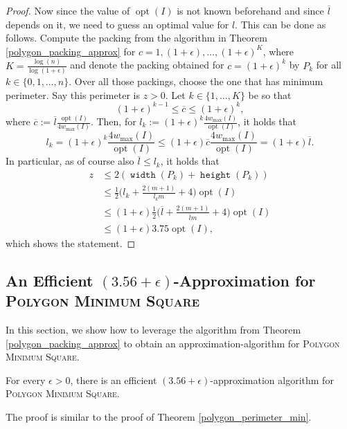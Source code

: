 \documentclass[a4paper,UKenglish,cleveref, autoref, thm-restate]{lipics_v2021}
\DeclareMathOperator{\opt}{opt}
\DeclareMathOperator{\width}{\mathtt{width}}
\DeclareMathOperator{\height}{\mathtt{height}}
\begin{document}
\begin{proof}
Now since the value of $\opt(I)$ is not known beforehand and since $\overline{l}$ depends on it, we need to guess an optimal value for $l$. This can be done as follows. Compute the packing from the algorithm in Theorem \ref{polygon_packing_approx} for $c=1,(1+\epsilon), \dots, (1+\epsilon)^K$, where $K=\frac{\log(n)}{\log(1+\epsilon)}$ and denote the packing obtained for $c=(1+\epsilon)^k$ by $P_k$ for all $k \in \{0,1, \dots, n\}$. Over all those packings, choose the one that has minimum perimeter. Say this perimeter is $z > 0$. Let $k \in \{1, \dots, K\}$ be so that
\[
(1+\epsilon)^{k-1} \leq \overline{c} \leq (1+\epsilon)^{k},
\]
where $\overline{c} := \overline{l} \frac{\opt(I)}{4w_{\max}(I)}$. Then, for $l_k := (1+\epsilon)^k \frac{4w_{\max}(I)}{\opt(I)}$, it holds that
\[
l_k = (1+\epsilon)^k \frac{4w_{\max}(I)}{\opt(I)} \leq (1+\epsilon) \overline{c}\frac{4w_{\max}(I)}{\opt(I)} = (1+\epsilon)\overline{l}.
\]
In particular, as of course also $\overline{l} \leq l_k$, it holds that
\begin{align*}
z & \leq 2(\width(P_k) + \height(P_k)) \\
&\leq \frac{1}{2} \bigg( l_k+\frac{2(m+1)}{l_km} + 4 \bigg) \opt(I) \\
&\leq (1+\epsilon) \frac{1}{2} \bigg( \overline{l}+\frac{2(m+1)}{\overline{l}m} + 4 \bigg) \opt(I) \\
&\leq (1+\epsilon)3.75 \opt(I),
\end{align*}
which shows the statement.
\end{proof}


\subsection{An Efficient $(3.56+\epsilon)$-Approximation for \textsc{Polygon Minimum Square}}
\label{section_polygon_min_square}

In this section, we show how to leverage the algorithm from Theorem \ref{polygon_packing_approx} to obtain an approximation-algorithm for \textsc{Polygon Minimum Square}.

\begin{theorem}
For every $\epsilon>0$, there is an efficient $(3.56+\epsilon)$-approximation algorithm for \textsc{Polygon Minimum Square}.
\end{theorem}

The proof is similar to the proof of Theorem \ref{polygon_perimeter_min}.
\end{document}
